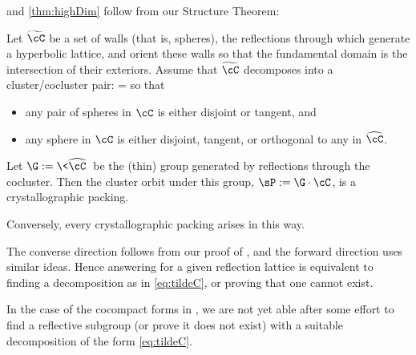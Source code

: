 \documentclass[12pt,reqno]{amsart}
\newcommand{\StructThm}{\hyperref[thm:tildeC]{Structure Theorem}}
\begin{document}
 and \ref{thm:highDim} follow from our Structure Theorem: %

\begin{thm}\label{thm:tildeC}
Let $\widetilde\cC$ be a  set of walls (that is, spheres), the reflections through which generate a hyperbolic lattice, and orient these walls
so that 
the fundamental domain
is the intersection of their exteriors.
Assume that $\widetilde\cC$ decomposes  into a cluster/cocluster pair:
\be\label{eq:tildeC}
\widetilde\cC=\cC\bigsqcup\widehat\cC
\ee
so that
\begin{itemize}
\item any pair of spheres in $\cC$ is either disjoint or tangent, and
\item
any sphere in $\cC$ is either disjoint, tangent, or orthogonal to any in $\widehat\cC$.
\end{itemize}
Let $\G:=\<\widehat\cC\>$ be the (thin) group generated by reflections through the cocluster.
Then the cluster orbit under this group, $\sP:=\G\cdot\cC$, is a crystallographic packing.

Conversely, every crystallographic packing arises in this way.
\end{thm}

The converse direction follows from our proof of , and the forward direction uses similar ideas.
Hence  answering   for a given reflection lattice is equivalent to finding a decomposition as in \eqref{eq:tildeC}, or proving that one cannot exist.

\begin{rmk}\label{rmk:coComp2}
In the case of the cocompact forms in , we are not yet able
after some effort
 to find a reflective subgroup (or prove it does not exist) with a suitable decomposition of the form \eqref{eq:tildeC}. 
 \end{rmk}


\end{document}
